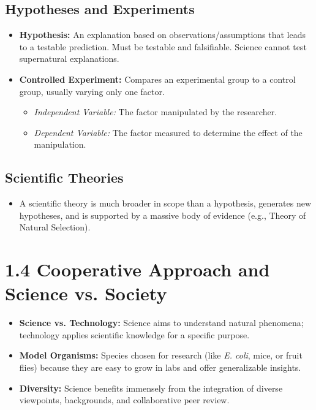 \documentclass[11pt, a4paper]{article}
\begin{document}
\subsection*{Hypotheses and Experiments}
\begin{itemize}
    \item \textbf{Hypothesis:} An explanation based on observations/assumptions that leads to a testable prediction. Must be testable and falsifiable. Science cannot test supernatural explanations.
    \item \textbf{Controlled Experiment:} Compares an experimental group to a control group, usually varying only one factor.
    \begin{itemize}
        \item \textit{Independent Variable:} The factor manipulated by the researcher.
        \item \textit{Dependent Variable:} The factor measured to determine the effect of the manipulation.
    \end{itemize}
\end{itemize}

\subsection*{Scientific Theories}
\begin{itemize}
    \item A scientific theory is much broader in scope than a hypothesis, generates new hypotheses, and is supported by a massive body of evidence (e.g., Theory of Natural Selection).
\end{itemize}

\section*{1.4 Cooperative Approach and Science vs. Society}
\begin{itemize}
    \item \textbf{Science vs. Technology:} Science aims to understand natural phenomena; technology applies scientific knowledge for a specific purpose.
    \item \textbf{Model Organisms:} Species chosen for research (like \textit{E. coli}, mice, or fruit flies) because they are easy to grow in labs and offer generalizable insights.
    \item \textbf{Diversity:} Science benefits immensely from the integration of diverse viewpoints, backgrounds, and collaborative peer review.
\end{itemize}
\end{document}
